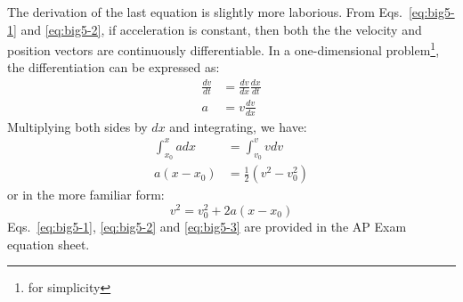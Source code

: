 \documentclass{../../../oss-handout}
\newcommand{\mb}[1]{\ensuremath\mathbf{#1}}
\begin{document}
The derivation of the last equation is slightly more laborious. From
Eqs.~\ref{eq:big5-1} and \ref{eq:big5-2}, if acceleration is constant, then
both the the velocity and position vectors are continuously differentiable. In
a one-dimensional problem\footnote{for simplicity}, the differentiation can be
expressed as:
\begin{align*}
  \frac{dv}{dt}&=\frac{dv}{dx}\frac{dx}{dt}\\
  a&=v\frac{dv}{dx}
\end{align*}
Multiplying both sides by $dx$ and integrating, we have:
\begin{align*}
  \int_{x_0}^x adx&=\int_{v_0}^v vdv\\
  a(x-x_0)&=\frac12\left(v^2-v_0^2\right)
\end{align*}
or in the more familiar form:
\begin{equation}
  \boxed{v^2 = v_0^2+ 2a(x-x_0)}
  \label{eq:big5-3}
\end{equation}
Eqs.~\ref{eq:big5-1}, \ref{eq:big5-2} and \ref{eq:big5-3} are provided in the
AP Exam equation sheet.
%  
%
\end{document}
